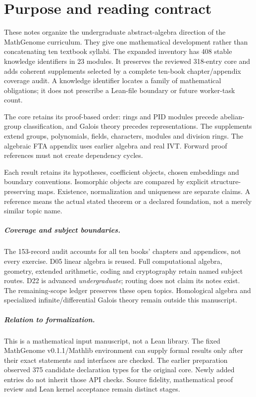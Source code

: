 \chapter*{Purpose and reading contract}
These notes organize the undergraduate abstract-algebra direction of the
MathGenome curriculum. They give one mathematical development rather than
concatenating ten textbook syllabi. The expanded inventory has
408 stable knowledge identifiers in 23 modules.
It preserves the reviewed 318-entry core and adds coherent supplements
selected by a complete ten-book chapter/appendix coverage audit.
A knowledge identifier locates a family of mathematical obligations; it
does not prescribe a Lean-file boundary or future worker-task count.

The core retains its proof-based order: rings and PID modules precede
abelian-group classification, and Galois theory precedes representations.
The supplements extend groups, polynomials, fields, characters, modules and
division rings. The algebraic FTA appendix uses earlier algebra and real
IVT. Forward proof references must not create dependency cycles.

Each result retains its hypotheses, coefficient objects, chosen embeddings
and boundary conventions. Isomorphic objects are compared by explicit
structure-preserving maps. Existence, normalization and uniqueness are
separate claims. A reference means the actual stated theorem or a declared
foundation, not a merely similar topic name.

\paragraph{Coverage and subject boundaries.}
The 153-record audit accounts for all ten books' chapters and appendices,
not every exercise. D05 linear algebra is reused. Full computational
algebra, geometry, extended arithmetic, coding and cryptography retain
named subject routes. D22 is advanced \emph{undergraduate}; routing does
not claim its notes exist. The remaining-scope ledger preserves these
open topics. Homological algebra and specialized infinite/differential
Galois theory remain outside this manuscript.

\paragraph{Relation to formalization.}
This is a mathematical input manuscript, not a Lean library. The fixed
MathGenome v0.1.1/Mathlib environment can supply formal results only after
their exact statements and interfaces are checked. The earlier preparation
observed 375 candidate declaration types for the original core. Newly added
entries do not inherit those API checks. Source fidelity, mathematical
proof review and Lean kernel acceptance remain distinct stages.

